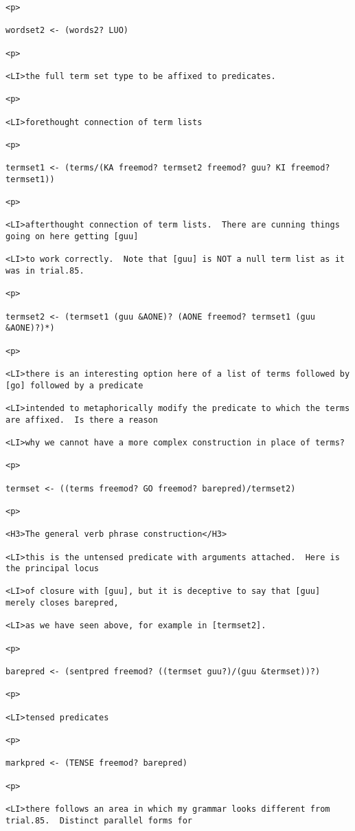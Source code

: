 \documentclass[12pt]{article}
\begin{document}
\begin{lstlisting}
<p>

wordset2 <- (words2? LUO)

<p>

<LI>the full term set type to be affixed to predicates.

<p>

<LI>forethought connection of term lists

<p>

termset1 <- (terms/(KA freemod? termset2 freemod? guu? KI freemod? termset1))

<p>

<LI>afterthought connection of term lists.  There are cunning things going on here getting [guu]

<LI>to work correctly.  Note that [guu] is NOT a null term list as it was in trial.85.

<p>

termset2 <- (termset1 (guu &AONE)? (AONE freemod? termset1 (guu &AONE)?)*)

<p>

<LI>there is an interesting option here of a list of terms followed by [go] followed by a predicate

<LI>intended to metaphorically modify the predicate to which the terms are affixed.  Is there a reason

<LI>why we cannot have a more complex construction in place of terms?

<p>

termset <- ((terms freemod? GO freemod? barepred)/termset2)

<p>

<H3>The general verb phrase construction</H3>

<LI>this is the untensed predicate with arguments attached.  Here is the principal locus

<LI>of closure with [guu], but it is deceptive to say that [guu] merely closes barepred,

<LI>as we have seen above, for example in [termset2].

<p>

barepred <- (sentpred freemod? ((termset guu?)/(guu &termset))?)

<p>

<LI>tensed predicates

<p>

markpred <- (TENSE freemod? barepred)

<p>

<LI>there follows an area in which my grammar looks different from trial.85.  Distinct parallel forms for


\end{lstlisting}
\end{document}
